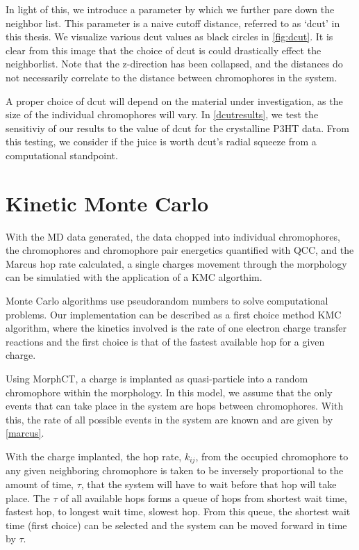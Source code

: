 In light of this, we introduce a parameter by which we further pare down the neighbor list. This parameter is
a naive cutoff distance, referred to as `dcut' in this thesis. We visualize various dcut values as black
circles in \autoref{fig:dcut}.
It is clear from this image that the choice of dcut is could drastically effect the
neighborlist.  
Note that the z-direction has been collapsed, and the distances do not necessarily correlate to the distance
between chromophores in the system.

A proper choice of dcut will depend on the material under investigation, 
as the size of the individual chromophores will vary. In 
\autoref{dcutresults}, we test the sensitiviy of our results to the value of dcut for the crystalline P3HT
data. From this testing, we consider if the juice is worth dcut's radial squeeze from a computational standpoint. 

\section{Kinetic Monte Carlo}
\label{KMC}

With the MD data generated, the data chopped into individual chromophores, 
the chromophores and chromophore pair energetics
quantified with QCC, and the Marcus hop rate calculated, 
a single charges movement through the morphology can be simulatied with the
application of a KMC algorthim.

Monte Carlo algorithms use pseudorandom numbers to solve computational problems. Our implementation can be
described as a first choice method KMC algorithm, where the kinetics involved is the rate of one electron
charge transfer reactions and the first choice is that of the fastest available hop for a given charge.

Using MorphCT, a charge is implanted as quasi-particle into a random chromophore within 
the morphology. In this model, we assume that the only events that can take place in the system are hops
between chromophores. With this, the rate of all possible events in the system are known and are given by
\autoref{marcus}. 

With the charge implanted, the hop rate, $k_{ij}$, from the occupied chromophore to any
given neighboring chromophore is taken to be
inversely proportional to the amount of time, $\tau$, that the system will have to wait before that hop will
take place. The $\tau$ of all available hops forms a queue of hops from shortest wait time, fastest hop, to
longest wait time, slowest hop. From this queue, the shortest wait time (first choice) can be selected
and the system can be moved forward in time by $\tau$.

